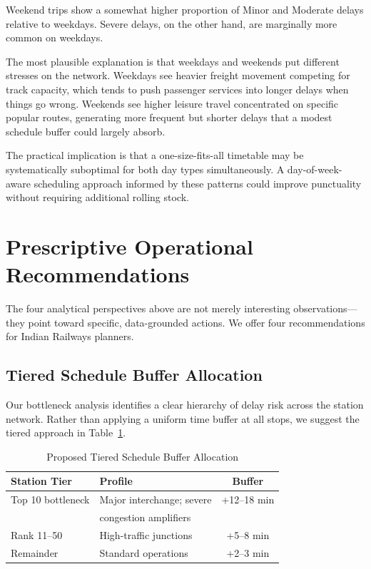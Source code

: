 \documentclass[conference]{IEEEtran}
\begin{document}
Weekend trips show a somewhat higher proportion of Minor and Moderate
delays relative to weekdays.
Severe delays, on the other hand, are marginally more common on weekdays.

The most plausible explanation is that weekdays and weekends put different
stresses on the network.
Weekdays see heavier freight movement competing for track capacity, which
tends to push passenger services into longer delays when things go wrong.
Weekends see higher leisure travel concentrated on specific popular routes,
generating more frequent but shorter delays that a modest schedule buffer
could largely absorb.

The practical implication is that a one-size-fits-all timetable may be
systematically suboptimal for both day types simultaneously.
A day-of-week-aware scheduling approach informed by these patterns could
improve punctuality without requiring additional rolling stock.

\section{Prescriptive Operational Recommendations}
\label{sec:recommendations}

The four analytical perspectives above are not merely interesting
observations---they point toward specific, data-grounded actions.
We offer four recommendations for Indian Railways planners.

\subsection{Tiered Schedule Buffer Allocation}

Our bottleneck analysis identifies a clear hierarchy of delay risk across
the station network.
Rather than applying a uniform time buffer at all stops, we suggest the
tiered approach in Table~\ref{tab:buffer}.

\begin{table}[htbp]
  \caption{Proposed Tiered Schedule Buffer Allocation}
  \label{tab:buffer}
  \begin{center}
    \begin{tabular}{|l|l|c|}
      \hline
      \textbf{Station Tier} & \textbf{Profile} & \textbf{Buffer} \\
      \hline
      Top 10 bottleneck  & Major interchange; severe & +12--18 min \\
                         & congestion amplifiers      & \\
      \hline
      Rank 11--50        & High-traffic junctions    & +5--8 min \\
      \hline
      Remainder          & Standard operations       & +2--3 min \\
      \hline
    \end{tabular}
  \end{center}
\end{table}
\end{document}
